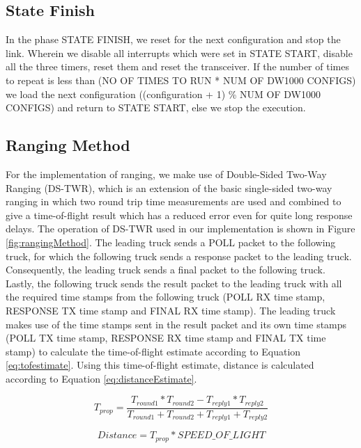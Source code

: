\subsection{State Finish}
In the phase STATE FINISH, we reset for the next configuration and stop the link. Wherein we disable all interrupts which were set in STATE START, disable all the three timers, reset them and reset the transceiver. If the number of times to repeat is less than (NO OF TIMES TO RUN * NUM OF DW1000 CONFIGS) we load the next configuration ((configuration + 1) \% NUM OF DW1000 CONFIGS) and return to STATE START, else we stop the execution.

\subsection{Ranging Method}
For the implementation of ranging, we make use of Double-Sided Two-Way Ranging (DS-TWR), which is an extension of the basic single-sided two-way ranging in which two round trip time measurements are used and combined to give a time-of-flight result which has a reduced error even for quite long response delays. The operation of DS-TWR used in our implementation is shown in Figure \ref{fig:rangingMethod}. The leading truck sends a POLL packet to the following truck, for which the following truck sends a response packet to the leading truck. Consequently, the leading truck sends a final packet to the following truck. Lastly, the following truck sends the result packet to the leading truck with all the required time stamps from the following truck (POLL RX time stamp, RESPONSE TX time stamp and FINAL RX time stamp). The leading truck makes use of the time stamps sent in the result packet and its own time stamps (POLL TX time stamp, RESPONSE RX time stamp and FINAL TX time stamp) to calculate the time-of-flight estimate according to  Equation \ref{eq:tofestimate}. Using this time-of-flight estimate, distance is calculated according to  Equation \ref{eq:distanceEstimate}.

\begin{equation}
\label{eq:tofestimate}
T_{prop}=\dfrac{T_{round1}*T_{round2}-T_{reply1}*T_{reply2}}{T_{round1}+T_{round2}+T_{reply1}+T_{reply2}}
\end{equation}

\begin{equation}
\label{eq:distanceEstimate}
Distance = T_{prop} * SPEED\_OF\_LIGHT
\end{equation}

